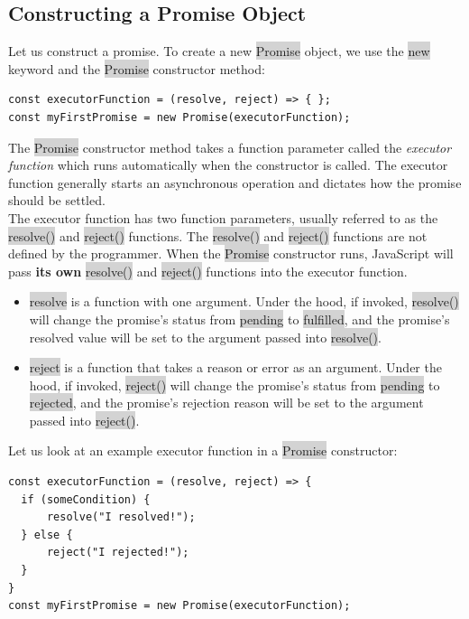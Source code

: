 \documentclass[11pt]{article}
\begin{document}
\subsection{Constructing a Promise Object}
Let us construct a promise. To create a new \colorbox{lightgray}{Promise} object, we use the \colorbox{lightgray}{new} keyword and the \colorbox{lightgray}{Promise} constructor method:
\begin{lstlisting}
const executorFunction = (resolve, reject) => { };
const myFirstPromise = new Promise(executorFunction);
\end{lstlisting}
The \colorbox{lightgray}{Promise} constructor method takes a function parameter called the \textit{executor function} which runs automatically when the constructor is called. The executor function generally starts an asynchronous operation and dictates how the promise should be settled. \\
\newline
The executor function has two function parameters, usually referred to as the \colorbox{lightgray}{resolve()} and \colorbox{lightgray}{reject()} functions. The \colorbox{lightgray}{resolve()} and \colorbox{lightgray}{reject()} functions are not defined by the programmer. When the \colorbox{lightgray}{Promise} constructor runs, JavaScript will pass \textbf{its own} \colorbox{lightgray}{resolve()} and \colorbox{lightgray}{reject()} functions into the executor function.
\begin{itemize}[leftmargin = *]
\item \colorbox{lightgray}{resolve} is a function with one argument. Under the hood, if invoked, \colorbox{lightgray}{resolve()} will change the promise’s status from \colorbox{lightgray}{pending} to \colorbox{lightgray}{fulfilled}, and the promise’s resolved value will be set to the argument passed into \colorbox{lightgray}{resolve()}.
\item \colorbox{lightgray}{reject} is a function that takes a reason or error as an argument. Under the hood, if invoked, \colorbox{lightgray}{reject()} will change the promise’s status from \colorbox{lightgray}{pending} to \colorbox{lightgray}{rejected}, and the promise’s rejection reason will be set to the argument passed into \colorbox{lightgray}{reject()}.
\end{itemize}
Let us look at an example executor function in a \colorbox{lightgray}{Promise} constructor:
\begin{lstlisting}
const executorFunction = (resolve, reject) => {
  if (someCondition) {
      resolve("I resolved!");
  } else {
      reject("I rejected!"); 
  }
}
const myFirstPromise = new Promise(executorFunction);
\end{lstlisting}
\end{document}

